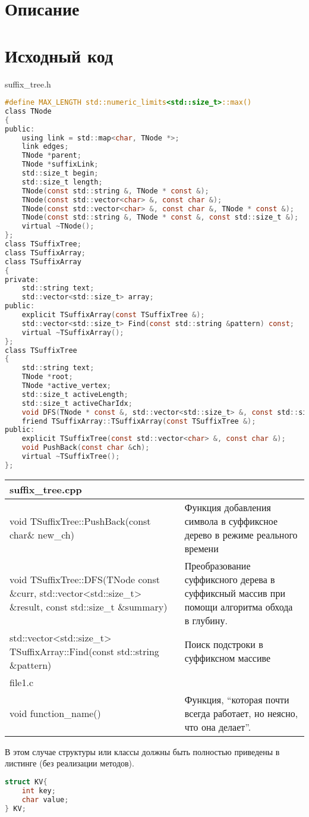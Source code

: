 \section{Описание}



\pagebreak

\section{Исходный код}
suffix\_tree.h
\begin{lstlisting}[language=C]
#define MAX_LENGTH std::numeric_limits<std::size_t>::max()
class TNode 
{
public:
    using link = std::map<char, TNode *>;
    link edges;
    TNode *parent;
    TNode *suffixLink;
    std::size_t begin;
    std::size_t length;
    TNode(const std::string &, TNode * const &);
    TNode(const std::vector<char> &, const char &);
    TNode(const std::vector<char> &, const char &, TNode * const &);
    TNode(const std::string &, TNode * const &, const std::size_t &);
    virtual ~TNode();
};
class TSuffixTree;
class TSuffixArray;
class TSuffixArray
{
private:
    std::string text;
    std::vector<std::size_t> array;
public:
    explicit TSuffixArray(const TSuffixTree &);
    std::vector<std::size_t> Find(const std::string &pattern) const;
    virtual ~TSuffixArray();
};
class TSuffixTree
{
    std::string text;
    TNode *root;
    TNode *active_vertex;
    std::size_t activeLength;
    std::size_t activeCharIdx;
    void DFS(TNode * const &, std::vector<std::size_t> &, const std::size_t &) const;
    friend TSuffixArray::TSuffixArray(const TSuffixTree &);
public:
    explicit TSuffixTree(const std::vector<char> &, const char &);
    void PushBack(const char &ch);
    virtual ~TSuffixTree();
};
\end{lstlisting}
\pagebreak
\begin{longtable}{|p{7.5cm}|p{7.5cm}|}
\hline
\hline
\rowcolor{lightgray}
\multicolumn{2}{|c|} {suffix\_tree.cpp}\\

\hline
void TSuffixTree::PushBack(const char\& new\_ch)&Функция добавления символа в суффиксное дерево в режиме реального времени\\
\hline
void TSuffixTree::DFS(TNode\* const \&curr, std::vector<std::size\_t> \&result, const std::size\_t \&summary)&Преобразование суффиксного дерева в суффиксный массив при помощи алгоритма обхода в глубину.\\
\hline
std::vector<std::size\_t> TSuffixArray::Find(const std::string \&pattern)&Поиск подстроки в суффиксном массиве\\
\hline
\hline
\rowcolor{lightgray}
\multicolumn{2}{|c|} {file1.c}\\
\hline
void function\_name()&Функция, \enquote{которая почти всегда работает, но неясно, что она делает}.\\
\hline
\end{longtable}
В этом случае структуры или классы должны быть полностью приведены в листинге (без реализации методов).
\begin{lstlisting}[language=C]
struct KV{
	int key;
	char value;
} KV;
\end{lstlisting}
\pagebreak

